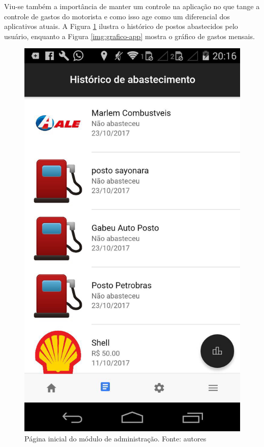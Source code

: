 Viu-se também a importância de manter um controle na aplicação no que tange a controle de gastos do motorista e como isso age como um diferencial dos aplicativos atuais. A Figura \ref{img:historico-app} ilustra o histórico de postos abastecidos pelo usuário, enquanto a Figura \ref{img:grafico-app} mostra o gráfico de gastos mensais.

\begin{figure}[H]
    \centering
    \includegraphics[scale=0.2]{figuras/historico-app.jpg}
    \caption[Página inicial do módulo de administração]{Página inicial do módulo de administração. Fonte: autores}
    \label{img:historico-app}
\end{figure}


